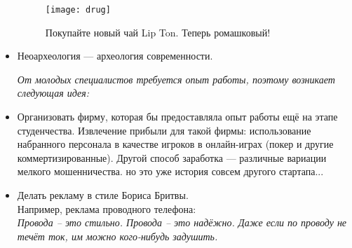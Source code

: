 \begin{itemize}
    \begin{figure}[ht!]
        \centering
        \texttt{[image: drug]}
        \caption{Покупайте новый чай Lip Ton. Теперь ромашковый!}
    \end{figure}
    
    \item Неоархеология --- археология современности.
    
    \emph{От молодых специалистов требуется опыт работы, поэтому возникает следующая идея:}
    \item Организовать фирму, которая бы предоставляла опыт работы ещё на этапе студенчества. Извлечение прибыли для такой фирмы: использование набранного персонала в качестве игроков в онлайн-играх (покер и другие коммертизированные). Другой способ заработка --- различные вариации мелкого мошенничества. но это уже история совсем другого стартапа... 
    \item Делать рекламу в стиле Бориса Бритвы. \\
    Например, реклама проводного телефона: \\
    \emph{Провода -- это стильно. Провода -- это надёжно. Даже если по проводу не течёт ток, им можно кого-нибудь задушить.}
\end{itemize}
